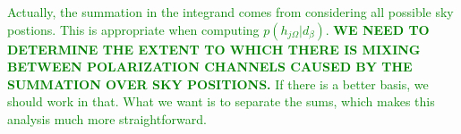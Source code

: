 \documentclass[10pt]{article}
\begin{document}
\textcolor{green}{Actually, the summation in the integrand comes from considering all possible sky postions. This is appropriate when computing $p(h_{j\Omega}|d_\beta)$. \textbf{WE NEED TO DETERMINE THE EXTENT TO WHICH THERE IS MIXING BETWEEN POLARIZATION CHANNELS CAUSED BY THE SUMMATION OVER SKY POSITIONS.} If there is a better basis, we should work in that. What we want is to separate the sums, which makes this analysis much more straightforward.}



\end{document}
